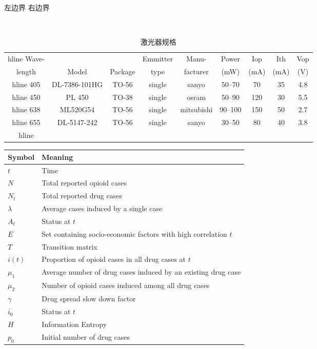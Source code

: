\documentclass{ctexart}
\begin{document}
 
\noindent 左边界 
\hfill 右边界 %
\begin{table}[!htbp] 
    \centering 
    \setlength
    \tabcolsep{2pt}%
    \addtolength{\tabcolsep}{20pt}%
    \caption{激光器规格}
    \label{tab:Laser_Specs} \
        \begin{tabular}{|c|c|c|c|c|c|c|c|c|} 
            \\hline Wave-& & & Emmitter & Manu- & Power & Iop & Ith & Vop \\
            [-3pt]%
            length& Model & Package & type & facturer & (mW) & (mA) & (mA) & (V)\\
            hline 405 & DL-7386-101HG & TO-56 & single & sanyo & 50--70 & 70 & 35 & 4.8\\
            hline 450 & PL 450 & TO-38 & single & osram & 50--90 & 120 & 30 & 5.5\\
            hline 638 & ML520G54 & TO-56 & single & mitsubishi & 90--100 & 150 & 50 & 2.7\\
            hline 655 & DL-5147-242 & TO-56 & single & sanyo & 30--50 & 80 & 40 & 3.8\\
            hline 
        \end{tabular} 
    \end{table} 

    \begin{table}[h]
        \centering
        \vspace{3pt}
        \begin{tabular}{>{\centering\arraybackslash}p{5em}>{\centering\arraybackslash}p{30em}}
        \toprule %
        Symbol & Meaning \\ \midrule
        $t$ & Time \\
        $N$ & Total reported opioid cases\\
        $N_t$ & Total reported drug cases\\
        $\lambda$ & Average cases induced by a single case\\
        $A_t$ & Status at $t$ \\ 
        $E$ & Set containing socio-economic factors with high correlation $t$ \\
        $T$ & Transition matrix\\ 
        $i(t)$ & Proportion of opioid cases in all drug cases at $t$ \\
        $\mu_1$ & Average number of drug cases induced by an existing drug case \\
        $\mu_2$ & Number of opioid cases induced among all drug cases \\
        $\gamma$ & Drug spread slow down factor \\
        $i_0$ & Status at $t$ \\ 
        $H$ & Information Entropy \\ 
        $p_0$ & Initial number of drug cases\\
        
        \bottomrule
        \end{tabular}
    \end{table}
\end{document}
